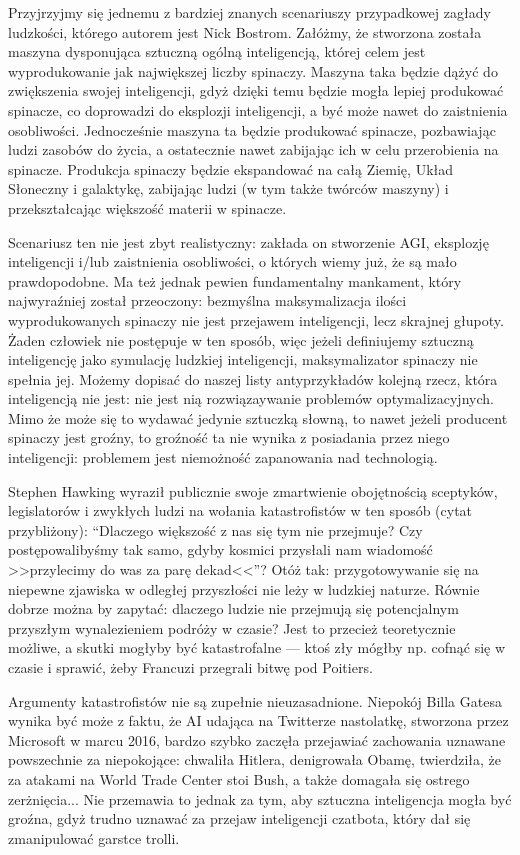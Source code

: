 \documentclass[10pt,a4paper]{article}
\begin{document}
	\par Przyjrzyjmy się jednemu z bardziej znanych scenariuszy przypadkowej zagłady ludzkości, którego autorem jest Nick Bostrom. Załóżmy, że stworzona została maszyna dysponująca sztuczną ogólną inteligencją, której celem jest wyprodukowanie jak największej liczby spinaczy. Maszyna taka będzie dążyć do zwiększenia swojej inteligencji, gdyż dzięki temu będzie mogła lepiej produkować spinacze, co doprowadzi do eksplozji inteligencji, a być może nawet do zaistnienia osobliwości. Jednocześnie maszyna ta będzie produkować spinacze, pozbawiając ludzi zasobów do życia, a ostatecznie nawet zabijając ich w celu przerobienia na spinacze. Produkcja spinaczy będzie ekspandować na całą Ziemię, Układ Słoneczny i galaktykę, zabijając ludzi (w tym także twórców maszyny) i przekształcając większość materii w spinacze.
	\par Scenariusz ten nie jest zbyt realistyczny: zakłada on stworzenie AGI, eksplozję inteligencji i/lub zaistnienia osobliwości, o których wiemy już, że są mało prawdopodobne. Ma też jednak pewien fundamentalny mankament, który najwyraźniej został przeoczony: bezmyślna maksymalizacja ilości wyprodukowanych spinaczy nie jest przejawem inteligencji, lecz skrajnej głupoty. Żaden człowiek nie postępuje w ten sposób, więc jeżeli definiujemy sztuczną inteligencję jako symulację ludzkiej inteligencji, maksymalizator spinaczy nie spełnia jej. Możemy dopisać do naszej listy antyprzykładów kolejną rzecz, która inteligencją nie jest: nie jest nią rozwiązaywanie problemów optymalizacyjnych. Mimo że może się to wydawać jedynie sztuczką słowną, to nawet jeżeli producent spinaczy jest groźny, to groźność ta nie wynika z posiadania przez niego inteligencji: problemem jest niemożność zapanowania nad technologią.
	\par Stephen Hawking wyraził publicznie swoje zmartwienie obojętnością sceptyków, legislatorów i zwykłych ludzi na wołania katastrofistów w ten sposób (cytat przybliżony): ``Dlaczego większość z nas się tym nie przejmuje? Czy postępowalibyśmy tak samo, gdyby kosmici przysłali nam wiadomość >>przylecimy do was za parę dekad<<''? Otóż tak: przygotowywanie się na niepewne zjawiska w odległej przyszłości nie leży w ludzkiej naturze. Równie dobrze można by zapytać: dlaczego ludzie nie przejmują się potencjalnym przyszłym wynalezieniem podróży w czasie? Jest to przecież teoretycznie możliwe, a skutki mogłyby być katastrofalne — ktoś zły mógłby np. cofnąć się w czasie i sprawić, żeby Francuzi przegrali bitwę pod Poitiers.
	\par Argumenty katastrofistów nie są zupełnie nieuzasadnione. Niepokój Billa Gatesa wynika być może z faktu, że AI udająca na Twitterze nastolatkę, stworzona przez Microsoft w marcu 2016, bardzo szybko zaczęła przejawiać zachowania uznawane powszechnie za niepokojące: chwaliła Hitlera, denigrowała Obamę, twierdziła, że za atakami na World Trade Center stoi Bush, a także domagała się ostrego zerżnięcia... Nie przemawia to jednak za tym, aby sztuczna inteligencja mogła być groźna, gdyż trudno uznawać za przejaw inteligencji czatbota, który dał się zmanipulować garstce trolli.
\end{document}
